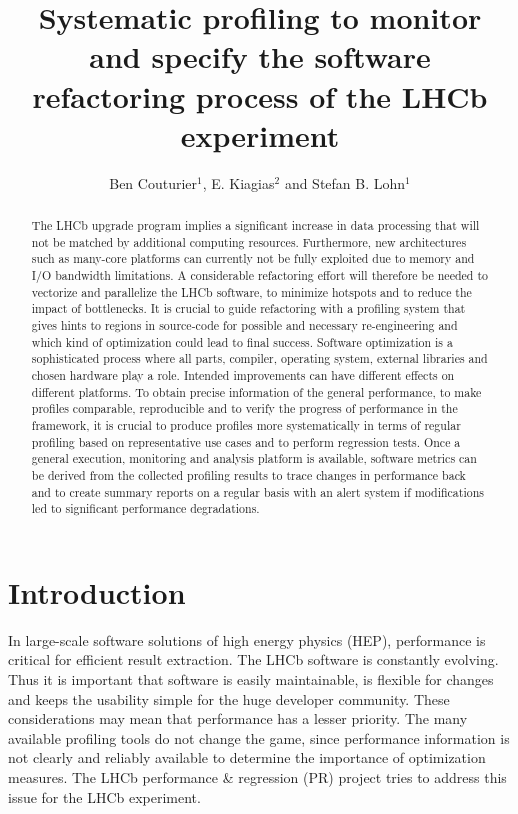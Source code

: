 \documentclass[a4paper]{jpconf}
\begin{document}
\title{Systematic profiling to monitor and specify the software refactoring process of the LHCb experiment}

\author{Ben Couturier$^{1}$, E. Kiagias$^{2}$ and Stefan B. Lohn$^{1}$}
\address{$^{1}$ CERN, CH-1211 Geneva 23, Switzerland}
\address{$^{2}$ University of Athens, Greece}


\begin{abstract}
The LHCb upgrade program implies a significant increase in data processing that will not be matched by additional computing resources. Furthermore, new architectures such as many-core platforms can currently not be fully exploited due to memory and I/O bandwidth limitations. A considerable refactoring effort will therefore be needed to vectorize and parallelize the LHCb software, to minimize hotspots and to reduce the impact of bottlenecks. It is crucial to guide refactoring with a profiling system that gives hints to regions in source-code for possible and necessary re-engineering and which kind of optimization could lead to final success.
\newline
Software optimization is a sophisticated process where all parts, compiler, operating system, external libraries and chosen hardware play a role. Intended improvements can have different effects on different platforms. To obtain precise information of the general performance, to make profiles comparable, reproducible and to verify the progress of performance in the framework, it is crucial to produce profiles more systematically in terms of regular profiling based on representative use cases and to perform regression tests. Once a general execution, monitoring and analysis platform is available, software metrics can be derived from the collected profiling results to trace changes in performance back and to create summary reports on a regular basis with an alert system if modifications led to significant performance degradations.
\end{abstract}

\section{Introduction}
\label{sec:introduction}

In large-scale software solutions of high energy physics (HEP), performance is critical for efficient result extraction. The LHCb software is constantly evolving. Thus it is important that software is easily maintainable, is flexible for changes and keeps the usability simple for the huge developer community. These considerations may mean that performance has a lesser priority. The many available profiling tools do not change the game, since performance information is not clearly and reliably available to determine the importance of optimization measures. The LHCb performance \& regression (PR) project tries to address this issue for the LHCb experiment.
\end{document}

